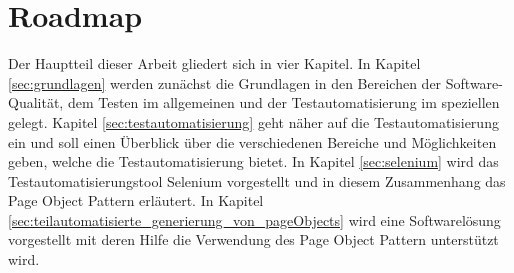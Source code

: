 \section{Roadmap}
\label{roadmap}
Der Hauptteil dieser Arbeit gliedert sich in vier Kapitel. In Kapitel \ref{sec:grundlagen} werden zunächst die Grundlagen in den Bereichen der Software-Qualität, dem Testen im allgemeinen und der Testautomatisierung im speziellen gelegt.
Kapitel \ref{sec:testautomatisierung} geht näher auf die Testautomatisierung ein und soll einen Überblick über die verschiedenen Bereiche und Möglichkeiten geben, welche die Testautomatisierung bietet.
In Kapitel \ref{sec:selenium} wird das Testautomatisierungstool Selenium vorgestellt und in diesem Zusammenhang das Page Object Pattern erläutert.
In Kapitel \ref{sec:teilautomatisierte_generierung_von_pageObjects} wird eine Softwarelösung vorgestellt mit deren Hilfe die Verwendung des Page Object Pattern unterstützt wird.

  




